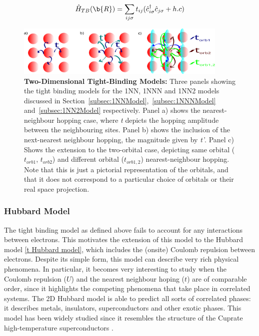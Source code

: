 \documentclass[11pt]{article}
\begin{document}
\begin{equation} \label{TBM}
    \hat{H}_{TB}(\b{R}) = \sum_{ij\sigma} t_{ij}(\hat{c}_{i\sigma}^{\dagger}\hat{c}_{j \sigma} + h.c)
\end{equation}


\begin{figure}[htbp]  %
    \centering
    \includegraphics[width=0.9\textwidth]{2Dhubbardmodel.png}  %
    \caption{\textbf{Two-Dimensional Tight-Binding Models:} Three panels showing the tight binding models for the 1NN, 1NNN and 1NN2 models discussed in Section~\ref{subsec:1NNModel},~\ref{subsec:1NNNModel} and~\ref{subsec:1NN2Model} respectively. Panel a) shows the nearest-neighbour hopping case, where \textit{t} depicts the hopping amplitude between the neighbouring sites. Panel b) shows the inclusion of the next-nearest neighbour hopping, the magnitude given by \textit{t'}.
    Panel c) Shows the extension to the two-orbital case, depicting  same orbital ($t_{orb1}$, $t_{orb2}$) and different orbital ($t_{orb1,2}$) nearest-neighbour hopping. Note that this is just a pictorial representation of the orbitals, and that it does not correspond to a particular choice of orbitals or their real space projection. }
    \label{fig:2D Hubbard model}
\end{figure}

\newpage

\subsubsection{Hubbard Model}
\label{subsec: HubbardModel}

The  tight binding model as defined above fails to account for any interactions between electrons. This motivates the extension of this model to the Hubbard model \eqref{t Hubbard model}, which includes the (onsite) Coulomb repulsion between electrons. Despite its simple form, this model can describe very rich physical phenomena.
In particular, it becomes very interesting to study when the Coulomb repulsion ($U$) and the nearest neighbour hoping ($t$) are of comparable order, since it highlights the competing phenomena that take place in correlated systems. 
The 2D Hubbard model is able to predict all sorts of correlated phases: it describes metals, insulators, superconductors and other exotic phases\cite{white1989numerical,hirsch1985two, anderson1990luttinger,sun2011nearly}. 
This model has been widely studied since it resembles the structure of the Cuprate high-temperature superconductors \cite{dagotto1994correlated}. 
\end{document}
